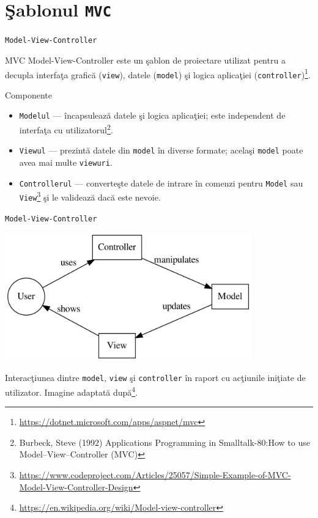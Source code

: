 \documentclass[presentation]{beamer}
\begin{document}
\section{Şablonul \texttt{MVC}}
\label{sec:org5a9c59e}
\begin{frame}[label={sec:orgf456b3e},fragile]{\texttt{Model-View-Controller}}
 \begin{block}{MVC}
\alert{Model-View-Controller} este un şablon de proiectare utilizat pentru a decupla interfaţa grafică (\texttt{view}), datele (\texttt{model}) şi logica aplicaţiei (\texttt{controller})\footnote{\url{https://dotnet.microsoft.com/apps/aspnet/mvc}}.
\end{block}
\end{frame}
\begin{frame}[label={sec:orgdab2c08},fragile]{Componente}
 \begin{itemize}
\item \texttt{Modelul} --- încapsulează datele şi logica aplicaţiei; este independent de interfaţa cu utilizatorul\footnote{Burbeck, Steve (1992) Applications Programming in Smalltalk-80:How to use Model–View–Controller (MVC)}.
\item \texttt{Viewul} --- prezintă datele din \texttt{model} în diverse formate; acelaşi \texttt{model} poate avea mai multe \texttt{viewuri}.
\item \texttt{Controllerul} --- converteşte datele de intrare în comenzi pentru \texttt{Model} sau \texttt{View}\footnote{\url{https://www.codeproject.com/Articles/25057/Simple-Example-of-MVC-Model-View-Controller-Design}} şi le validează dacă este nevoie.
\end{itemize}
\end{frame}
\begin{frame}[label={sec:org3e3fbd1},fragile]{\texttt{Model-View-Controller}}
 \begin{center}
\includegraphics[width=0.8\textwidth]{./img/diagrama-mvc.png}
\end{center}

\tiny
Interacţiunea dintre \texttt{model}, \texttt{view} şi \texttt{controller} în raport cu acţiunile iniţiate de utilizator.
Imagine adaptată după\footnote{\url{https://en.wikipedia.org/wiki/Model-view-controller}}.
\end{frame}
\end{document}
